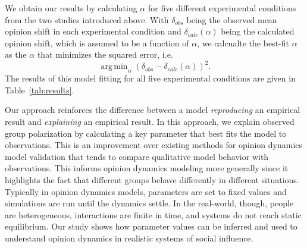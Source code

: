 \documentclass[a4paper,12pt]{article}
\DeclareMathOperator*{\argmin}{arg\,min} %
\begin{document}
We obtain our results by calculating $\alpha$ for five different experimental
conditions from the two studies introduced above. With $\delta_{obs}$ being
the observed mean opinion shift in each experimental condition and 
$\delta_{calc}(\alpha)$ being the calculated opinion shift, which is assumed to
be a function of $\alpha$, we calcualte the best-fit $\alpha$ as the $\alpha$
that minimizes the squared error, i.e.\
\[
  \argmin_{\alpha} \left( \delta_{obs} - \delta_{calc}(\alpha) \right )^2.
\]
The results of this model fitting for all five experimental conditions are
given in Table~\ref{tab:results}.

Our approach reinforces the difference between a model \emph{reproducing} an 
empirical result and \emph{explaining} an empirical result. In this approach, we
explain observed group polarization by calculating a key parameter that best fits
the model to observations. This is an improvement over existing methods
for opinion dynamics model validation that tends to compare qualitative 
model behavior with observations. This informs opinion dynamics modeling more
generally since it highlights the fact that different groups behave differently
in different situations. Typically in opinion dynamics models, parameters are
set to fixed values and simulations are run until the dynamics settle. In the
real-world, though, people are heterogeneous, 
interactions are finite in time, and systems do not reach
static equilibrium. Our study shows how parameter values can be inferred and
used to understand opinion dynamics in realistic systems of social influence. 



\end{document}

